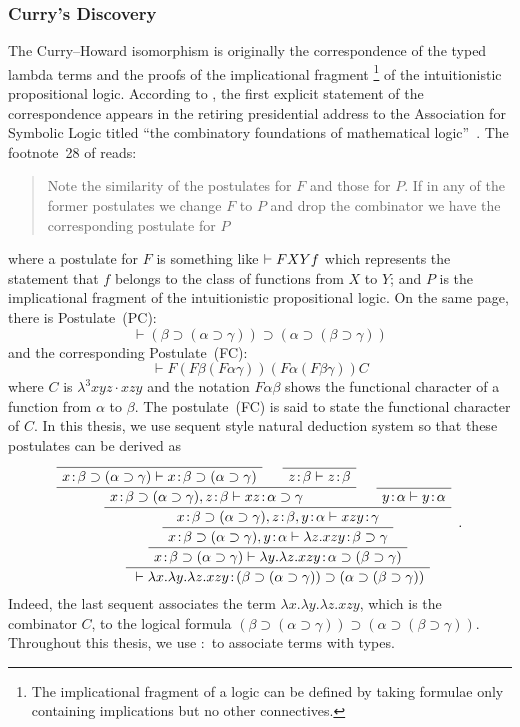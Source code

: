 \subsubsection{Curry's Discovery}
The Curry--Howard isomorphism is originally the correspondence of
the typed lambda terms and the proofs of the implicational fragment%
 \footnote{The implicational fragment of a
 logic can be defined by taking formulae only containing implications
 but no other connectives.} of
the intuitionistic propositional logic.
According to \citep{curryhoward}, the first explicit statement of the
correspondence appears
in the retiring presidential address to the Association for Symbolic
Logic titled ``the combinatory foundations of mathematical
logic''~\cite{curry1942}.
The footnote~28 of \citep{curry1942} reads:
 \begin{quote}
  Note the similarity of the postulates for $F$ and those for $P$.  If
  in any of the former postulates we change $F$ to $P$ and drop the
  combinator we have the corresponding postulate for $P$
 \end{quote}
 where a postulate for $F$ is something like $\vdash F X Y f$ which
 represents the statement that $f$ belongs to the
 class of functions from $X$ to $Y$; and $P$ is the implicational
 fragment of the intuitionistic propositional logic.
 On the same page, there is Postulate~(PC):
\[
 \vdash (\beta\supset (\alpha\supset \gamma))\supset (\alpha \supset
 (\beta\supset \gamma))
\]
and the corresponding Postulate~(FC):
\[
 \vdash F(F\beta(F\alpha\gamma))(F\alpha(F\beta\gamma))C
\]
 where $C$ is $\lambda^3 xyz\cdot xzy$ and the notation $F\alpha\beta$
 shows the
 functional character of a
 function from $\alpha$ to $\beta$.  The postulate~(FC) is said to
 state the functional character of $C$.
 In this thesis, we use sequent style natural deduction system so that these
 postulates can be derived as
 \[
 \AxiomC{}
 \useq{\tj{x}{\beta\supset (\alpha\supset \gamma)}}{\tj{x}{\beta\supset
 (\alpha\supset \gamma)}}
 \AxiomC{}
 \useq{\tj{z}{\beta}}{\tj{z}{\beta}}
 \bseq{\tj{x}{\beta\supset (\alpha\supset \gamma)},
 \tj{z}{\beta}}{\tj{xz}{\alpha\supset\gamma}}
 \AxiomC{}
 \useq{\tj{y}{\alpha}}{\tj{y}{\alpha}}
 \bseq{\tj{x}{\beta\supset (\alpha\supset \gamma)},
 \tj{z}{\beta},\tj{y}{\alpha}}{\tj{xzy}{\gamma}}
 \useq{\tj{x}{\beta\supset (\alpha\supset
 \gamma)},\tj{y}{\alpha}}{\tj{\lambda z. xzy}{\beta\supset\gamma}}
 \useq{\tj{x}{\beta\supset (\alpha\supset
 \gamma)}}{\tj{\lambda y.\lambda z. xzy}{\alpha\supset(\beta\supset\gamma)}}
 \useq{}{\tj{\lambda x.\lambda y.\lambda z. xzy}{{(\beta\supset (\alpha\supset
 \gamma))}\supset (\alpha\supset(\beta\supset\gamma))}}
 \DisplayProof \enspace .
 \]
 Indeed, the last sequent associates the term $\lambda x.\lambda
 y.\lambda z. xzy$, which is the combinator $C$, to the logical formula
 $(\beta\supset (\alpha\supset
 \gamma))\supset (\alpha\supset(\beta\supset\gamma))$.
 Throughout this thesis, we use $\colon$ to associate terms with types.

